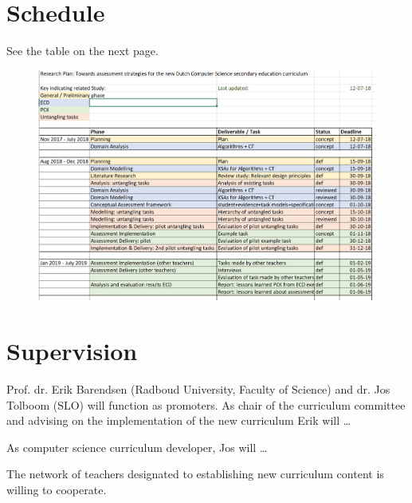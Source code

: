 
\section{Schedule}\label{sec:Schedule}

See the table on the next page.

\begin{figure}
\includegraphics[scale=1.0]{figures/schedule.png}
\end{figure}


\section{Supervision}\label{sec:Supervision}

Prof. dr. Erik Barendsen (Radboud University, Faculty of Science) and dr. Jos Tolboom (SLO) will function as promoters.
As chair of the curriculum committee and advising on the implementation of the new curriculum Erik will \dots

As computer science curriculum developer, Jos will \ldots

The network of teachers designated to establishing new curriculum content is willing to cooperate.
